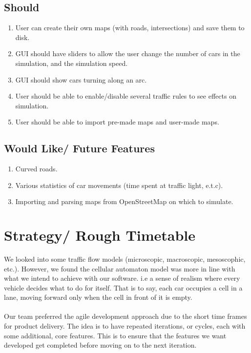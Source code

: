 \documentclass[11pt, a4paper]{article}
\begin{document}
\subsection{Should} \label{sub:should}
\begin{enumerate}[itemsep = -1ex]
\item User can create their own maps (with roads, intersections) and save them to disk.
\item GUI should have sliders to allow the user change the number of cars in the simulation, and the simulation speed.
\item GUI should show cars turning along an arc.
\item User should be able to enable/disable several traffic rules to see effects on simulation.
\item User should be able to import pre-made maps and user-made maps.
\end{enumerate}

\subsection{Would Like/ Future Features } \label{sub:would}
\begin{enumerate}[itemsep = -1ex]
\item Curved roads.
\item Various statistics of car movements (time spent at traffic light, e.t.c).
\item Importing and parsing maps from OpenStreetMap on which to simulate.
\end{enumerate}

\section{Strategy/ Rough Timetable}\label{dev:meth}
\paragraph{}
We looked into some traffic flow models (microscopic, macroscopic, mesoscophic, etc.). However, we found the cellular automaton model was more in line with what we intend to achieve with our software. i.e a sense of realism where every vehicle decides what to do for itself. That is to say, each car occupies a cell in a lane, moving forward only when the cell in front of it is empty.
\paragraph{}
Our team preferred the agile development approach due to the short time frames for product delivery. The idea is to have repeated iterations, or cycles, each with some additional, core features. This is to ensure that the features we want developed get completed before moving on to the next iteration.
\end{document}
